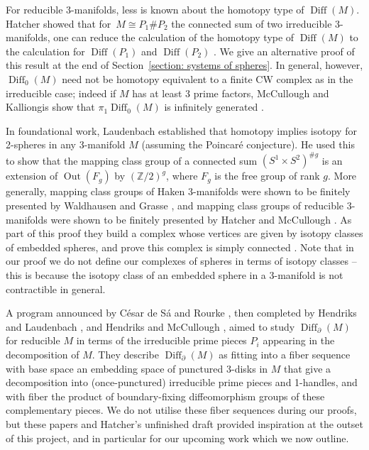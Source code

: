 \documentclass{amsart}
\theoremstyle{plain}
\theoremstyle{definition}
\DeclareMathOperator\Diff{Diff}
\DeclareMathOperator{\Out}{Out}
\newcommand{\Z}{\mathbb{Z}}
\begin{document}
For reducible 3-manifolds, less is known about the homotopy type of $\Diff(M)$. Hatcher showed that for~$M\cong P_1 \# P_2$ the connected sum of two irreducible 3-manifolds, one can reduce the calculation of the homotopy type of $\Diff(M)$ to the calculation for $\Diff(P_1)$ and $\Diff(P_2)$ \cite{Hatcher1981}. We give an alternative proof of this result at the end of Section~\ref{section: systems of spheres}. In general, however, $\Diff_0(M)$ need not be homotopy equivalent to a finite CW complex as in the irreducible case; indeed if $M$ has at least 3 prime factors, McCullough and Kalliongis show that $\pi_1\Diff_0(M)$ is infinitely generated \cite{KalliongisMcCullough}.

In foundational work, Laudenbach \cite{Laudenbach73} established that homotopy implies isotopy for 2-spheres in any 3-manifold $M$ (assuming the Poincar\'{e} conjecture). He used this to show that the mapping class group of a connected sum $(S^1\times S^2)^{\# g}$ is an extension of $\Out(F_g)$ by $(\Z/2)^g$, where $F_g$ is the free group of rank $g$.  More generally, mapping class groups of Haken 3-manifolds were shown to be finitely presented by Waldhausen \cite{Waldhausen68} and Grasse \cite{Grasse1989}, and mapping class groups of reducible 3-manifolds were shown to be finitely presented by Hatcher and McCullough \cite{HatcherMcCullough1990}. As part of this proof they build a complex whose vertices are given by isotopy classes of embedded spheres, and prove this complex is simply connected \cite[Proposition 2.2]{HatcherMcCullough1990}. Note that in our proof we do not define our complexes of spheres in terms of isotopy classes -- this is because the isotopy class of an embedded sphere in a 3-manifold is not contractible in general.

A program announced by C\'esar de S\'a and Rourke \cite{CesardeSaRourke}, then completed by Hendriks and Laudenbach \cite{HendriksLaudenbach1984}, and Hendriks and McCullough \cite{HendriksMcCullough},  aimed to study  $\Diff_\partial(M)$ for reducible $M$ in terms of the irreducible prime pieces $P_i$ appearing in the decomposition of $M$. They describe $\Diff_\partial(M)$ as fitting into a fiber sequence with base space an embedding space of punctured 3-disks in $M$ that give a decomposition into (once-punctured) irreducible prime pieces and 1-handles, and with fiber the product of boundary-fixing diffeomorphism groups of these complementary pieces. We do not utilise these fiber sequences during our proofs, but these papers and Hatcher's unfinished draft \cite{HatcherReducible}  provided inspiration at the outset of this project, and in particular for our upcoming work which we now outline.
\end{document}
